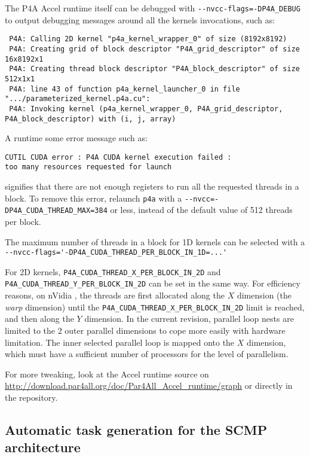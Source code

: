 \documentclass[a4paper]{article}
\begin{document}
The P4A Accel runtime itself can be debugged with
\verb|--nvcc-flags=-DP4A_DEBUG| to output debugging messages around all
the \Acuda kernels invocations, such as: {\scriptsize
\begin{verbatim}
 P4A: Calling 2D kernel "p4a_kernel_wrapper_0" of size (8192x8192)
 P4A: Creating grid of block descriptor "P4A_grid_descriptor" of size 16x8192x1
 P4A: Creating thread block descriptor "P4A_block_descriptor" of size 512x1x1
 P4A: line 43 of function p4a_kernel_launcher_0 in file ".../parameterized_kernel.p4a.cu":
 P4A: Invoking kernel (p4a_kernel_wrapper_0, P4A_grid_descriptor, P4A_block_descriptor) with (i, j, array)
\end{verbatim}
}

A runtime some error message such as:
\begin{verbatim}
CUTIL CUDA error : P4A CUDA kernel execution failed :
too many resources requested for launch
\end{verbatim}
signifies that there are not enough registers to run all the requested
threads in a block. To remove this error,
relaunch \texttt{p4a} with a
\verb|--nvcc=-DP4A_CUDA_THREAD_MAX=384| or less, instead of the default
value of 512 threads per block.

The maximum number of threads in a block for 1D
kernels can be selected with a
\verb|--nvcc-flags='-DP4A_CUDA_THREAD_PER_BLOCK_IN_1D=...'|

For 2D kernels, \verb|P4A_CUDA_THREAD_X_PER_BLOCK_IN_2D| and
\verb|P4A_CUDA_THREAD_Y_PER_BLOCK_IN_2D| can be set in the same way. For
efficiency reasons, on nVidia \Agpu, the threads are first allocated along
the $X$ dimension (the \emph{warp} dimension) until the
\verb|P4A_CUDA_THREAD_X_PER_BLOCK_IN_2D| limit is reached, and then along
the $Y$ dimension. In the current revision, parallel loop nests are
limited to the 2 outer parallel dimensions to cope more easily with \Acuda
\Agpu hardware limitation. The inner selected parallel loop is mapped onto
the $X$ \Agpu dimension, which must have a sufficient number of processors
for the level of parallelism.

For more tweaking, look at the \Apfa Accel runtime source on
\url{http://download.par4all.org/doc/Par4All_Accel_runtime/graph} or
directly in the \Agit repository.

\subsection{Automatic task generation for the SCMP architecture}
\label{sec:scmp}
\end{document}
